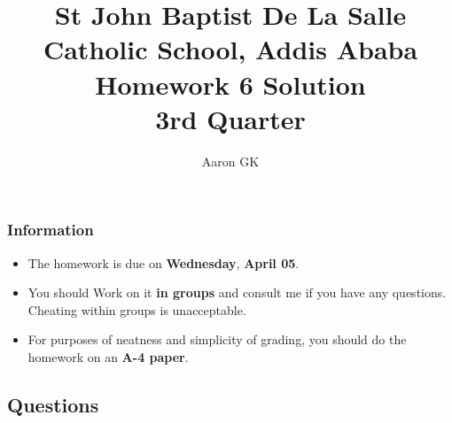\documentclass[11pt,addpoints]{exam}
\author{Aaron GK}
\begin{document}
	\title{St John Baptist De La Salle Catholic School, Addis Ababa\\
		\large Homework 6 Solution\\
		3rd Quarter}
	\maketitle
	\begin{center}
		\subsubsection*{Information}
		\begin{itemize}
			\item The homework is due on \textbf{Wednesday}, \textbf{April 05}.
			\item You should Work on it \textbf{in groups} and consult me if you have any questions. Cheating within groups is unacceptable.
			\item For purposes of neatness and simplicity of grading, you should do the homework on an \textbf{A-4 paper}.
		\end{itemize}
	\end{center}
	\begin{center}
		\subsection*{Questions}
	\end{center}
\end{document}

